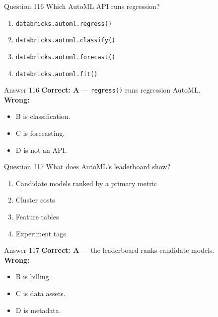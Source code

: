 \documentclass[aspectratio=169,11pt]{beamer}
\begin{document}
	\begin{frame}{Question 116}
		Which AutoML API runs regression?
		\begin{enumerate}[label=\Alph*.]
			\item \texttt{databricks.automl.regress()}
			\item \texttt{databricks.automl.classify()}
			\item \texttt{databricks.automl.forecast()}
			\item \texttt{databricks.automl.fit()}
		\end{enumerate}
	\end{frame}
	\begin{frame}{Answer 116}
		\textbf{Correct: A} --- \texttt{regress()} runs regression AutoML.\\
		\vspace{0.5em}
		\textbf{Wrong:}
		\begin{itemize}
			\item B is classification.
			\item C is forecasting.
			\item D is not an API.
		\end{itemize}
	\end{frame}
	
	\begin{frame}{Question 117}
		What does AutoML's leaderboard show?
		\begin{enumerate}[label=\Alph*.]
			\item Candidate models ranked by a primary metric
			\item Cluster costs
			\item Feature tables
			\item Experiment tags
		\end{enumerate}
	\end{frame}
	\begin{frame}{Answer 117}
		\textbf{Correct: A} --- the leaderboard ranks candidate models.\\
		\vspace{0.5em}
		\textbf{Wrong:}
		\begin{itemize}
			\item B is billing.
			\item C is data assets.
			\item D is metadata.
		\end{itemize}
	\end{frame}
	
\end{document}
